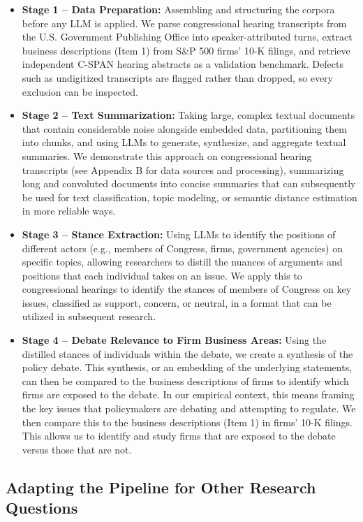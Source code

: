 \documentclass[11pt]{article}
\begin{document}
\begin{itemize}
    \item \textbf{Stage 1 -- Data Preparation:} Assembling and structuring the corpora before any LLM is applied. We parse congressional hearing transcripts from the U.S. Government Publishing Office into speaker-attributed turns, extract business descriptions (Item 1) from S\&P 500 firms' 10-K filings, and retrieve independent C-SPAN hearing abstracts as a validation benchmark. Defects such as undigitized transcripts are flagged rather than dropped, so every exclusion can be inspected.
    \item \textbf{Stage 2 -- Text Summarization:} Taking large, complex textual documents that contain considerable noise alongside embedded data, partitioning them into chunks, and using LLMs to generate, synthesize, and aggregate textual summaries. We demonstrate this approach on congressional hearing transcripts (see Appendix B for data sources and processing), summarizing long and convoluted documents into concise summaries that can subsequently be used for text classification, topic modeling, or semantic distance estimation in more reliable ways.
    \item \textbf{Stage 3 -- Stance Extraction:} Using LLMs to identify the positions of different actors (e.g., members of Congress, firms, government agencies) on specific topics, allowing researchers to distill the nuances of arguments and positions that each individual takes on an issue. We apply this to congressional hearings to identify the stances of members of Congress on key issues, classified as support, concern, or neutral, in a format that can be utilized in subsequent research.
    \item \textbf{Stage 4 -- Debate Relevance to Firm Business Areas:} Using the distilled stances of individuals within the debate, we create a synthesis of the policy debate. This synthesis, or an embedding of the underlying statements, can then be compared to the business descriptions of firms to identify which firms are exposed to the debate. In our empirical context, this means framing the key issues that policymakers are debating and attempting to regulate. We then compare this to the business descriptions (Item 1) in firms' 10-K filings. This allows us to identify and study firms that are exposed to the debate versus those that are not.
\end{itemize}

\subsection{Adapting the Pipeline for Other Research Questions}
\end{document}
